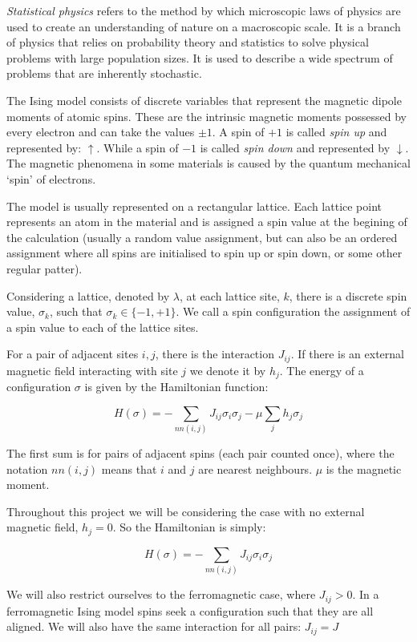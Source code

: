 \documentclass[pdftex,12pt,a4paper]{article}
\begin{document}
\emph{Statistical physics} refers to the method by which microscopic laws of physics are used to create an understanding of nature on a macroscopic scale. It is a branch of physics that relies on probability theory and statistics to solve physical problems with large population sizes. It is used to describe a wide spectrum of problems that are inherently stochastic.

The Ising model consists of discrete variables that represent the magnetic dipole moments of atomic spins. These are the intrinsic magnetic moments possessed by every electron and can take the values $\pm1$. A spin of $+1$ is called \emph{spin up} and represented by: $\uparrow$. While a spin of $-1$ is called \emph{spin down} and represented by $\downarrow$. The magnetic phenomena in some materials is caused by the quantum mechanical ‘spin’ of electrons.

The model is usually represented on a rectangular lattice. Each lattice point represents an atom in the material and is assigned a spin value at the begining of the calculation (usually a random value assignment, but can also be an ordered assignment where all spins are initialised to spin up or spin down, or some other regular patter).

Considering a lattice, denoted by $\lambda$, at each lattice site, $k$, there is a discrete spin value, $\sigma_k$, such that $\sigma_k \in \{-1,+1\}$. We call a spin configuration the assignment of a spin value to each of the lattice sites.

For a pair of adjacent sites $i,j$, there is the interaction $J_{ij}$. If there is an external magnetic field interacting with site $j$ we denote it by $h_j$. The energy of a configuration $\sigma$ is given by the Hamiltonian function:

\[ H(\sigma) = - \sum_{nn(i,j)} J_{ij} \sigma_i \sigma_j - \mu \sum_{j} h_j \sigma_j \]

The first sum is for pairs of adjacent spins (each pair counted once), where the notation $nn(i,j)$ means that $i$ and $j$ are nearest neighbours. $\mu$ is the magnetic moment.

Throughout this project we will be considering the case with no external magnetic field, $h_j = 0$. So the Hamiltonian is simply:

\[ H(\sigma) = - \sum_{nn(i,j)} J_{ij} \sigma_i \sigma_j  \]

We will also restrict ourselves to the ferromagnetic case, where $J_{ij} > 0$. In a ferromagnetic Ising model spins seek a configuration such that they are all aligned. We will also have the same interaction for all pairs: $J_{ij} = J$
\end{document}
